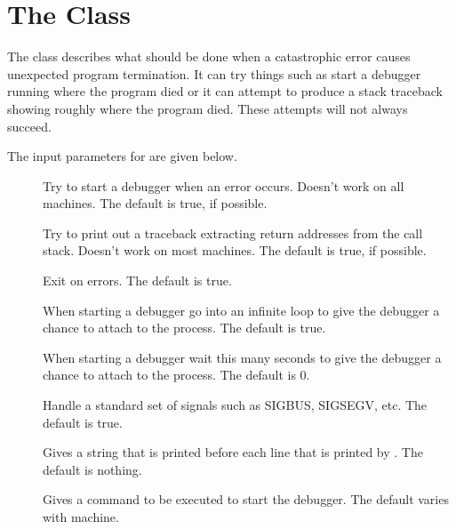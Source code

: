 
\section{The  Class}
\label{Debugger}

The  class describes what should be done when
a catastrophic error causes unexpected program termination.
It can try things such as start a debugger running where
the program died or it can attempt to produce a stack traceback
showing roughly where the program died.  These attempts will not
always succeed.

The  input parameters for  are given
below.

\begin{description}
 \item[] Try to start a debugger when an error occurs.
        Doesn't work on all machines. The default is true, if possible.

 \item[] Try to print out a traceback extracting return
        addresses from the call stack.  Doesn't work on most machines.  The
        default is true, if possible.

 \item[] Exit on errors.  The default is true.

 \item[] When starting a debugger go into an
        infinite loop to give the debugger a chance to attach to the
        process.  The default is true.

 \item[] When starting a debugger wait this many seconds to
        give the debugger a chance to attach to the process.  The default
        is 0.

 \item[] Handle a standard set of signals such as
        SIGBUS, SIGSEGV, etc.  The default is true.

 \item[] Gives a string that is printed before each line that
        is printed by . The default is nothing.

 \item[] Gives a command to be executed to start the debugger.
        The default varies with machine.

\end{description}

